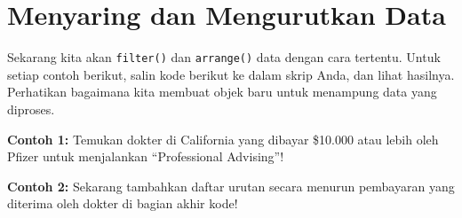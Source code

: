 \documentclass[
]{book}
\newenvironment{Shaded}{\begin{snugshade}}{\end{snugshade}}
\newcommand{\CommentTok}[1]{\textcolor[rgb]{0.56,0.35,0.01}{\textit{#1}}}
\newcommand{\DecValTok}[1]{\textcolor[rgb]{0.00,0.00,0.81}{#1}}
\newcommand{\KeywordTok}[1]{\textcolor[rgb]{0.13,0.29,0.53}{\textbf{#1}}}
\newcommand{\NormalTok}[1]{#1}
\newcommand{\OperatorTok}[1]{\textcolor[rgb]{0.81,0.36,0.00}{\textbf{#1}}}
\newcommand{\StringTok}[1]{\textcolor[rgb]{0.31,0.60,0.02}{#1}}
\begin{document}
\hypertarget{menyaring-dan-mengurutkan-data}{%
\section{Menyaring dan Mengurutkan Data}\label{menyaring-dan-mengurutkan-data}}

Sekarang kita akan \texttt{filter()} dan \texttt{arrange()} data dengan cara tertentu. Untuk setiap contoh berikut, salin kode berikut ke dalam skrip Anda, dan lihat hasilnya. Perhatikan bagaimana kita membuat objek baru untuk menampung data yang diproses.

\textbf{Contoh 1:} Temukan dokter di California yang dibayar \$10.000 atau lebih oleh Pfizer untuk menjalankan ``Professional Advising''!

\begin{Shaded}
\end{Shaded}

\textbf{Contoh 2:} Sekarang tambahkan daftar urutan secara menurun pembayaran yang diterima oleh dokter di bagian akhir kode!
\end{document}
